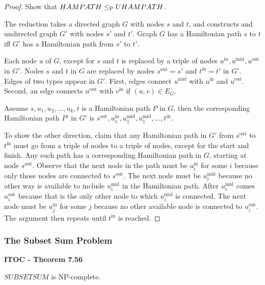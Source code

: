 \begin{mdframed}
\begin{proof}
Show that $HAMPATH \leq_\P UHAMPATH$.

\medskip
The reduction takes a directed graph $G$ with nodes $s$ and $t$, and constructs and undirected graph $G'$ with nodes $s'$ and $t'$. Graph $G$ has a Hamiltonian path $s$ to $t$ iff $G'$ has a Hamiltonian path from $s'$ to $t'$. 

\medskip
Each node $u$ of $G$, except for $s$ and $t$ is replaced by a triple of nodes $u^\text{in}, u^\text{mid}, u^\text{out}$ in $G'$. Nodes $s$ and $t$ in $G$ are replaced by nodes $s^\text{out} = s'$ and $t^\text{in} = t'$ in $G'$. Edges of two types appear in $G'$. First, edges connect $u^\text{mid}$ with $u^\text{in}$ and $u^\text{out}$. Second, an edge connects $u^\text{out}$ with $v^\text{in}$ if $(u, v) \in E_G$.

\medskip
Assume $s, u_1, u_2, \ldots, u_k, t$ is a Hamiltonian path $P$ in $G$, then the corresponding Hamiltonian path $P'$ in $G'$ is $s^\text{out}, u_1^\text{in}, u_1^\text{mid}, u_1^\text{mid}, \ldots, t^\text{in}$.

To show the other direction, claim that any Hamiltonian path in $G'$ from $s^\text{out}$ to $t^\text{in}$ must go from a triple of nodes to a triple of nodes, except for the start and finish. Any such path has a corresponding Hamiltonian path in $G$. starting at node $s^\text{out}$. Observe that the next node in the path must be $u_i^\text{in}$ for some $i$ because only those nodes are connected to $s^\text{out}$. The next node must be $u_i^\text{mid}$ because no other way is available to include $u_i^\text{mid}$ in the Hamiltonian path. After $u_i^\text{mid}$ comes $u_i^\text{out}$ because that is the only other node to which $u_i^\text{mid}$ is connected. The next node must be $u_j^\text{in}$ for some $j$ because no other available node is connected to $u_i^\text{out}$. The argument then repeats until $t^\text{in}$ is reached.
\end{proof}
\end{mdframed}


\subsubsection{The Subset Sum Problem}

\label{lang:SUBSETSUM_NPC}
\begin{shaded}
\textbf{ITOC - Theorem 7.56}

\medskip
$SUBSETSUM$ is NP-complete.
\end{shaded}